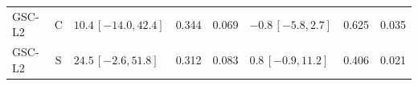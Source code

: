 \documentclass[10pt,a4paper]{article}
\begin{document}
\begin{longtable}{lcp{37mm}rrp{37mm}rr}
GSC-L2 & C & \(10.4\,[-14.0,42.4]\) & 0.344 & 0.069 & \(-0.8\,[-5.8,2.7]\) & 0.625 & 0.035\\
GSC-L2 & S & \(24.5\,[-2.6,51.8]\) & 0.312 & 0.083 & \(0.8\,[-0.9,11.2]\) & 0.406 & 0.021\\

\end{longtable}
\end{document}
